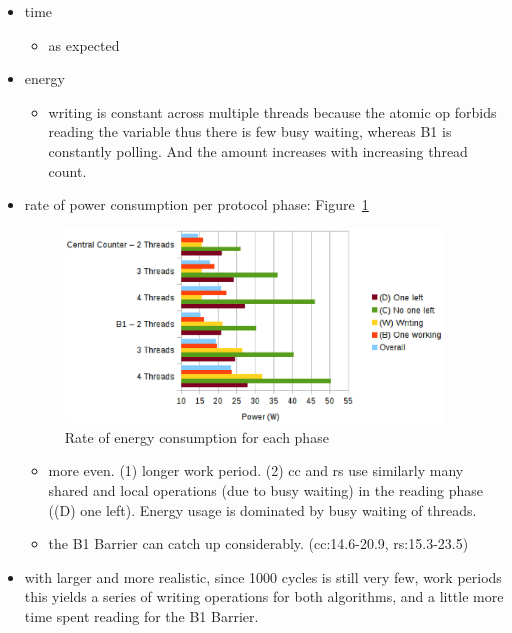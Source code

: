 \documentclass[a4paper, 10pt]{article}
\begin{document}
\begin{itemize}
\begin{itemize}
		\end{itemize}
	\item time
		\begin{itemize}
			\item as expected
		\end{itemize}
	\item energy
		\begin{itemize}
			\item writing is constant across multiple threads because the atomic op forbids reading the variable thus there is few busy waiting, whereas B1 is constantly polling. And the amount increases with increasing thread count.
		\end{itemize}
	\item rate of power consumption per protocol phase: Figure~\ref{fig:c1-power-work-1000}
		\begin{figure}[htbp]
			\centering
			\includegraphics[width=10cm]{charts/c1-power-work-1000}
			\caption{Rate of energy consumption for each phase}
			\label{fig:c1-power-work-1000}
		\end{figure}
		\begin{itemize}
			\item more even. (1) longer work period. (2) cc and rs use similarly many shared and local operations (due to busy waiting) in the reading phase ((D) one left). Energy usage is dominated by busy waiting of threads.
			\item the B1 Barrier can catch up considerably. (cc:14.6-20.9, rs:15.3-23.5)
		\end{itemize}
	\item with larger and more realistic, since 1000 cycles is still very few, work periods this yields a series of writing operations for both algorithms, and a little more time spent reading for the B1 Barrier.
\end{itemize}
\end{document}

